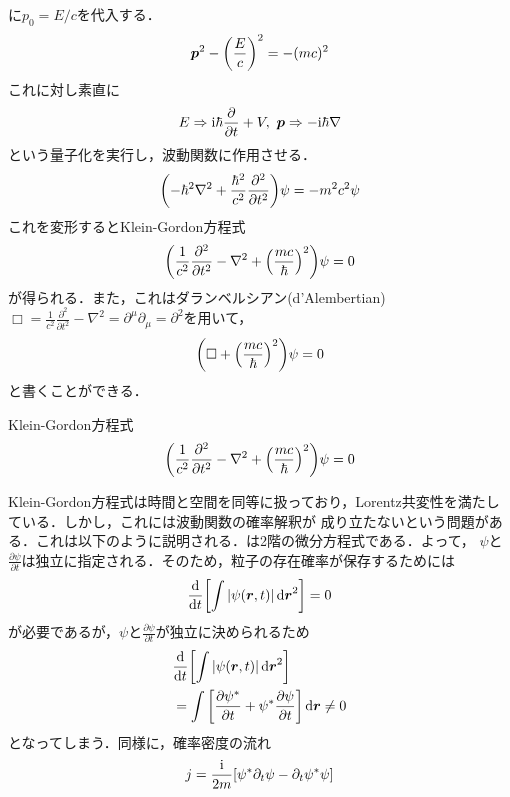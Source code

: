\documentclass{report}
\begin{document}
に$p_0 = E/c$を代入する．
\begin{align}
  \bm{p}^2 - \qty(\frac{E}{c})^2 = -(mc)^2
\end{align}
これに対し素直に
\begin{align}
  E \Rightarrow \mathrm{i}\hbar\frac{\partial}{\partial t} + V,\ \bm{p} \Rightarrow -\mathrm{i}\hbar \nabla 
\end{align}
という量子化を実行し，波動関数に作用させる．
\begin{align}
  \qty(-\hbar^2\nabla^2 + \frac{\hbar^2}{c^2}\frac{\partial^2}{\partial t^2})\psi = -m^2c^2\psi
\end{align}
これを変形するとKlein-Gordon方程式
\begin{align}
  \qty(\frac{1}{c^2}\frac{\partial^2}{\partial t^2} - \nabla^2 + \qty(\frac{mc}{\hbar})^2)\psi = 0 \label{Klein-Gordon-equation}
\end{align}
が得られる．また，これはダランベルシアン(d'Alembertian)$\Box = \frac{1}{c^2}\frac{\partial^2}{\partial t^2} - \nabla^2 = \partial^\mu\partial_\mu = \partial^2$を用いて，
\begin{align}
  \qty(\Box + \qty(\frac{mc}{\hbar})^2)\psi = 0
\end{align}
と書くことができる．
\begin{itembox}[l]{Klein-Gordon方程式}
  \begin{equation}
    \qty(\frac{1}{c^2}\frac{\partial^2}{\partial t^2} - \nabla^2 + \qty(\frac{mc}{\hbar})^2)\psi = 0
  \end{equation}
\end{itembox}
Klein-Gordon方程式は時間と空間を同等に扱っており，Lorentz共変性を満たしている．しかし，これには波動関数の確率解釈が
成り立たないという問題がある．これは以下のように説明される．は2階の微分方程式である．よって，
$\psi$と$\frac{\partial \psi}{\partial t}$は独立に指定される．そのため，粒子の存在確率が保存するためには
\begin{align}
  \frac{\mathrm{d}}{\dd{t}}\qty[\int \abs{\psi(\bm{r}, t)} \dd{\bm{r}}^2] = 0
\end{align}
が必要であるが，$\psi$と$\frac{\partial \psi}{\partial t}$が独立に決められるため
\begin{align}
  &\frac{\mathrm{d}}{\dd{t}}\qty[\int \abs{\psi(\bm{r}, t)} \dd{\bm{r}}^2]\\
  &= \int \qty[\frac{\partial \psi^{*}}{\partial t} + \psi^{*}\frac{\partial \psi}{\partial t}] \dd{\bm{r}} \neq 0
\end{align}
となってしまう．同様に，確率密度の流れ
\begin{align}
  j = \frac{\mathrm{i}}{2m}[\psi^{*}\partial_t\psi - \partial_t \psi^{*}\psi]
\end{align}
\end{document}
